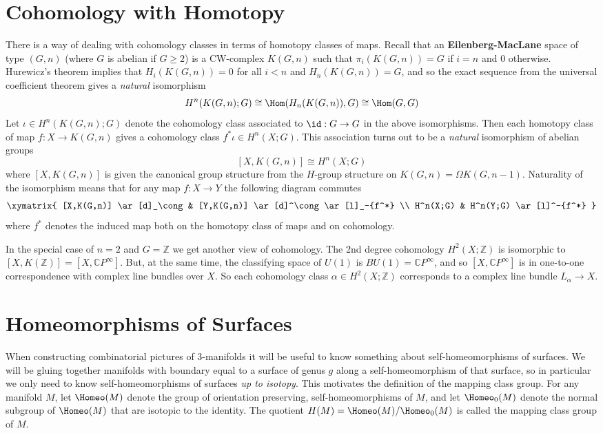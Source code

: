 \newpage
\section{Cohomology with Homotopy}
\label{Cohomology with Homotopy}

There is a way of dealing with cohomology classes in terms of homotopy classes of maps. Recall that an \textbf{Eilenberg-MacLane} space of type $(G,n)$ (where $G$ is abelian if $G \geq 2$) is a CW-complex $K(G,n)$ such that $\pi_i(K(G,n)) = G$ if $i=n$ and $0$ otherwise. Hurewicz's theorem implies that $H_i(K(G,n)) = 0$ for all $i < n$ and $H_n(K(G,n)) = G$, and so the exact sequence from the universal coefficient theorem gives a \emph{natural} isomorphism
\[ H^n(K(G,n);G) \cong \Hom(H_n(K(G,n)),G) \cong \Hom(G,G) \]
Let $\iota \in H^n(K(G,n);G)$ denote the cohomology class associated to $\id : G \rightarrow G$ in the above isomorphisms. Then each homotopy class of map $f : X \rightarrow K(G,n)$ gives a cohomology class $f^*\iota \in H^n(X;G)$. This association turns out to be a \emph{natural} isomorphism of abelian groups
\[ [X,K(G,n)] \cong H^n(X;G) \]
where $[X,K(G,n)]$ is given the canonical group structure from the $H$-group structure on $K(G,n) = \Omega K(G,n-1)$. Naturality of the isomorphism means that for any map $f : X \rightarrow Y$ the following diagram commutes
\[
\xymatrix
{
	[X,K(G,n)] \ar[d]_\cong & [Y,K(G,n)] \ar[d]^\cong \ar[l]_-{f^*} \\
	H^n(X;G) & H^n(Y;G) \ar[l]^-{f^*}
}
\]
where $f^*$ denotes the induced map both on the homotopy class of maps and on cohomology.

In the special case of $n=2$ and $G=\mathbb Z$ we get another view of cohomology. The 2nd degree cohomology $H^2(X;\mathbb Z)$ is isomorphic to $[X,K(\mathbb Z)] = [X,\mathbb CP^\infty]$. But, at the same time, the classifying space of $U(1)$ is $BU(1) = \mathbb CP^\infty$, and so $[X,\mathbb CP^\infty]$ is in one-to-one correspondence with complex line bundles over $X$. So each cohomology class $\alpha \in H^2(X;\mathbb Z)$ corresponds to a complex line bundle $L_\alpha \rightarrow X$.





\newpage
\section{Homeomorphisms of Surfaces}
\label{Homeomorphisms of Surfaces}


When constructing combinatorial pictures of 3-manifolds it will be useful to know something about self-homeomorphisms of surfaces. We will be gluing together manifolds with boundary equal to a surface of genus $g$ along a self-homeomorphism of that surface, so in particular we only need to know self-homeomorphisms of surfaces \emph{up to isotopy}. This motivates the definition of the mapping class group. For any manifold $M$, let $\Homeo(M)$ denote the group of orientation preserving, self-homeomorphisms of $M$, and let $\Homeo_0(M)$ denote the normal subgroup of $\Homeo(M)$ that are isotopic to the identity. The quotient $H(M) = \Homeo(M) / \Homeo_0(M)$ is called the mapping class group of $M$. 

